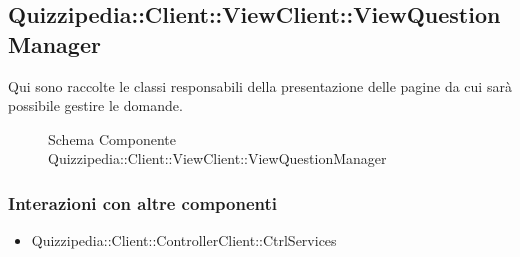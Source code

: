 \subsection{Quizzipedia::Client::ViewClient::ViewQuestionManager}
Qui sono raccolte le classi responsabili della presentazione delle pagine da cui sarà possibile gestire le domande.
\begin{figure}[H]
\centering
\noindent{}
\caption[Schema Componente Quizzipedia::Client::ViewClient::ViewQuestionManager]{Schema Componente Quizzipedia::Client::ViewClient::ViewQuestionManager}
\end{figure}
\subsubsection{Interazioni con altre componenti}
\begin{itemize}
\item Quizzipedia::Client::ControllerClient::CtrlServices
\end{itemize}
